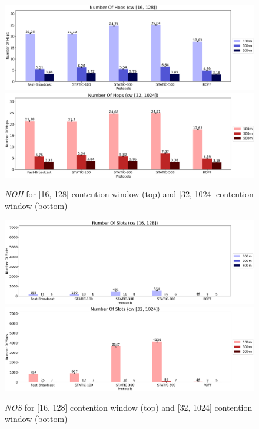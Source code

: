 		\begin{figure}[H]
			\centering
			\includegraphics[width=1.0\textwidth]{immagini/la-25/cw/16/noh}
			\includegraphics[width=1.0\textwidth]{immagini/la-25/cw/32/noh}
			\caption{\textit{NOH} for [16, 128] contention window (top) and [32, 1024] contention window (bottom)}
			\label{fig:la-cw-noh}
		\end{figure}
	
		\begin{figure}[H]
			\centering
			\includegraphics[width=1.0\textwidth]{immagini/la-25/cw/16/nos}
			\includegraphics[width=1.0\textwidth]{immagini/la-25/cw/32/nos}
			\caption{\textit{NOS} for [16, 128] contention window (top) and [32, 1024] contention window (bottom)}
			\label{fig:la-cw-nos}
		\end{figure}
	
